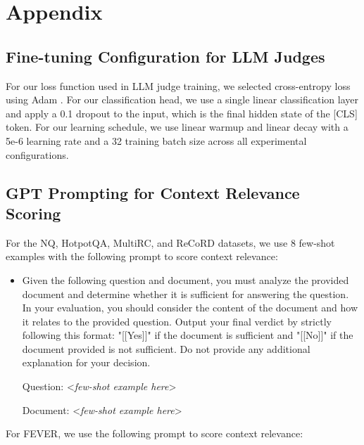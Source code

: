 
\appendix

\section{Appendix}
\label{sec:appendix}

\subsection{Fine-tuning Configuration for LLM Judges}
\label{sec:finetuning_configuration}

For our loss function used in LLM judge training, we selected cross-entropy loss using Adam \cite{kingma2017adam}. 
For our classification head, we use a single linear classification layer and apply a 0.1 dropout to the input, which is the final hidden state of the [CLS] token.
For our learning schedule, we use linear warmup and linear decay \cite{howard-ruder-2018-universal} with a 5e-6 learning rate and a 32 training batch size across all experimental configurations.

\subsection{GPT Prompting for Context Relevance Scoring}
\label{sec:gpt_prompting_for_context_relevance_scoring}

For the NQ, HotpotQA, MultiRC, and ReCoRD datasets, we use 8 few-shot examples with the following prompt to score context relevance:

\begin{itemize}
    \item Given the following question and document, you must analyze the provided document and determine whether it is sufficient for answering the question. 
    In your evaluation, you should consider the content of the document and how it relates to the provided question. 
    Output your final verdict by strictly following this format: "[[Yes]]" if the document is sufficient and "[[No]]" if the document provided is not sufficient. 
    Do not provide any additional explanation for your decision.
    
    Question: <\textit{few-shot example here}>
    
    Document: <\textit{few-shot example here}>
    
\end{itemize}

For FEVER, we use the following prompt to score context relevance:

